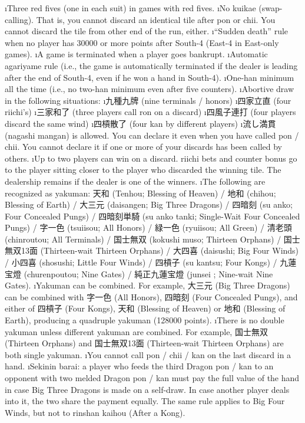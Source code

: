 \bi
\i Three red fives (one in each suit) in games with red fives.
\i No {\jap kuikae} (swap-calling). That is, you cannot discard an identical tile after {\jap pon} or {\jap chii}. You cannot discard the tile from other end of the run, either. 
\i ``Sudden death'' rule when no player has 30000 or more points after South-4 (East-4 in East-only games).
\i A game is terminated when a player goes bankrupt.
\i Automatic {\jap agariyame} rule (i.e., the game is automatically terminated if the dealer is leading after the end of South-4, even if he won a hand in South-4).
\i One-{\jap han} minimum all the time (i.e., no two-{\jap han} minimum even after five counters).
\i Abortive draw in the following situations:
	\bi
	\i 九種九牌 (nine terminals / honors)
	\i 四家立直 (four riichi's)
	\i 三家和了 (three players call {\jap ron} on a discard)
	\i 四風子連打 (four players discard the same wind)
	\i 四槓散了 (four {\jap kan} by different players)
	\ei
\i 流し満貫 ({\jap nagashi mangan}) is allowed. You can declare it even when you have called {\jap pon} / {\jap chii}. You cannot declare it if one or more of your discards has been called by others.
\i Up to two players can win on a discard. riichi bets and counter bonus go to the player sitting closer to the player who discarded the winning tile. The dealership remains if the dealer is one of the winners.
\i The following are recognized as {\jap yakuman}: 
天和 ({\jap Tenhou}; Blessing of Heaven) / 地和 ({\jap chihou}; Blessing of Earth) / 大三元 ({\jap daisangen}; Big Three Dragons) / 四暗刻 ({\jap su anko}; Four Concealed Pungs) / 四暗刻単騎 ({\jap su anko tanki}; Single-Wait Four Concealed Pungs) / 字一色 ({\jap tsuiisou}; All Honors) / 緑一色 ({\jap ryuiisou}; All Green) / 清老頭 ({\jap chinroutou}; All Terminals) / 国士無双 ({\jap kokushi muso}; Thirteen Orphans) / 国士無双13面 (Thirteen-wait Thirteen Orphans) / 大四喜 ({\jap daisushi}; Big Four Winds) / 小四喜 ({\jap shosushi}; Little Four Winds) / 四槓子 ({\jap su kantsu}; Four Kongs) / 九蓮宝燈 ({\jap churenpoutou}; Nine Gates) / 純正九蓮宝燈 ({\jap junsei} ; Nine-wait Nine Gates).
\i {\jap Yakuman} can be combined. For example, 大三元 (Big Three Dragons) can be combined with 字一色 (All Honors), 四暗刻 (Four Concealed Pungs), and either of 四槓子 (Four Kongs), 天和 (Blessing of Heaven) or 地和 (Blessing of Earth), producing a quadruple {\jap yakuman} (128000 points). 
\i There is no double {\jap yakuman} unless different {\jap yakuman} are combined. For example, 国士無双 (Thirteen Orphans) and 国士無双13面 (Thirteen-wait Thirteen Orphans) are both single {\jap yakuman}. 
\i You cannot call {\jap pon} / {\jap chii} / {\jap kan} on the last discard in a hand. 
\i {\jap Sekinin barai}: a player who feeds the third Dragon {\jap pon} / {\jap kan} to an opponent with two melded Dragon {\jap pon} / {\jap kan} must pay the full value of the hand in case Big Three Dragons is made on a self-draw. In case another player deals into it, the two share the payment equally. The same rule applies to Big Four Winds, but not to {\jap rinshan kaihou} (After a Kong).  
\ei



